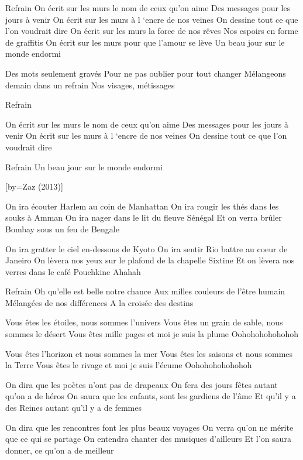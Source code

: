 \beginverse
Refrain 
On écrit sur les murs le nom de ceux qu’on aime
Des messages pour les jours à venir
On écrit sur les murs à l ‘encre de nos veines
On dessine tout ce que l’on voudrait dire
On écrit sur les murs la force de nos rêves
Nos espoirs en forme de graffitis
On écrit sur les murs pour que l’amour se lève
Un beau jour sur le monde endormi
\endverse

\beginverse
Des mots seulement gravés
Pour ne pas oublier pour tout changer
Mélangeons demain dans un refrain
Nos visages, métissages
\endverse

\beginverse
Refrain 
\endverse

\beginverse
On écrit sur les murs le nom de ceux qu’on aime
Des messages pour les jours à venir
On écrit sur les murs à l ‘encre de nos veines
On dessine tout ce que l’on voudrait dire
\endverse

\beginverse
Refrain 
Un beau jour sur le monde endormi
\endverse

[by={Zaz (2013)}]

\beginverse
On ira écouter Harlem au coin de Manhattan
On ira rougir les thés dans les souks à Amman
On ira nager dans le lit du fleuve Sénégal
Et on verra brûler Bombay sous un feu de Bengale
\endverse

\beginverse
On ira gratter le ciel en-dessous de Kyoto
On ira sentir Rio battre au coeur de Janeiro
On lèvera nos yeux sur le plafond de la chapelle Sixtine
Et on lèvera nos verres dans le café Pouchkine
Ahahah
\endverse

\beginverse
Refrain
Oh qu'elle est belle notre chance
Aux milles couleurs de l'être humain
Mélangées de nos différences
A la croisée des destins
\endverse

\beginverse
Vous êtes les étoiles, nous sommes l'univers
Vous êtes un grain de sable, nous sommes le désert
Vous êtes mille pages et moi je suis la plume
Oohohohohohohoh
\endverse

\beginverse
Vous êtes l'horizon et nous sommes la mer
Vous êtes les saisons et nous sommes la Terre
Vous êtes le rivage et moi je suis l'écume
Oohohohohohohoh
\endverse

\beginverse
On dira que les poètes n'ont pas de drapeaux
On fera des jours fêtes autant qu'on a de héros
On saura que les enfants, sont les gardiens de l'âme
Et qu'il y a des Reines autant qu'il y a de femmes
\endverse

\beginverse
On dira que les rencontres font les plus beaux voyages
On verra qu'on ne mérite que ce qui se partage
On entendra chanter des musiques d'ailleurs
Et l'on saura donner, ce qu'on a de meilleur
\endverse

